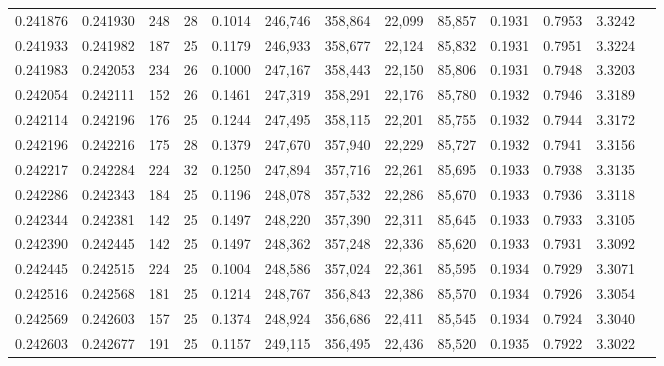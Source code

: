 \begin{tabular}{rrrrrrrrrrrrr}
0.241876 & 0.241930 &   248 &  28 &                                     0.1014 & 246,746 & 358,864 &  22,099 &  85,857 & 0.1931 & 0.7953 & 3.3242 \\
0.241933 & 0.241982 &   187 &  25 &                                     0.1179 & 246,933 & 358,677 &  22,124 &  85,832 & 0.1931 & 0.7951 & 3.3224 \\
0.241983 & 0.242053 &   234 &  26 &                                     0.1000 & 247,167 & 358,443 &  22,150 &  85,806 & 0.1931 & 0.7948 & 3.3203 \\
0.242054 & 0.242111 &   152 &  26 &                                     0.1461 & 247,319 & 358,291 &  22,176 &  85,780 & 0.1932 & 0.7946 & 3.3189 \\
0.242114 & 0.242196 &   176 &  25 &                                     0.1244 & 247,495 & 358,115 &  22,201 &  85,755 & 0.1932 & 0.7944 & 3.3172 \\
0.242196 & 0.242216 &   175 &  28 &                                     0.1379 & 247,670 & 357,940 &  22,229 &  85,727 & 0.1932 & 0.7941 & 3.3156 \\
0.242217 & 0.242284 &   224 &  32 &                                     0.1250 & 247,894 & 357,716 &  22,261 &  85,695 & 0.1933 & 0.7938 & 3.3135 \\
0.242286 & 0.242343 &   184 &  25 &                                     0.1196 & 248,078 & 357,532 &  22,286 &  85,670 & 0.1933 & 0.7936 & 3.3118 \\
0.242344 & 0.242381 &   142 &  25 &                                     0.1497 & 248,220 & 357,390 &  22,311 &  85,645 & 0.1933 & 0.7933 & 3.3105 \\
0.242390 & 0.242445 &   142 &  25 &                                     0.1497 & 248,362 & 357,248 &  22,336 &  85,620 & 0.1933 & 0.7931 & 3.3092 \\
0.242445 & 0.242515 &   224 &  25 &                                     0.1004 & 248,586 & 357,024 &  22,361 &  85,595 & 0.1934 & 0.7929 & 3.3071 \\
0.242516 & 0.242568 &   181 &  25 &                                     0.1214 & 248,767 & 356,843 &  22,386 &  85,570 & 0.1934 & 0.7926 & 3.3054 \\
0.242569 & 0.242603 &   157 &  25 &                                     0.1374 & 248,924 & 356,686 &  22,411 &  85,545 & 0.1934 & 0.7924 & 3.3040 \\
0.242603 & 0.242677 &   191 &  25 &                                     0.1157 & 249,115 & 356,495 &  22,436 &  85,520 & 0.1935 & 0.7922 & 3.3022 \\

\end{tabular}
